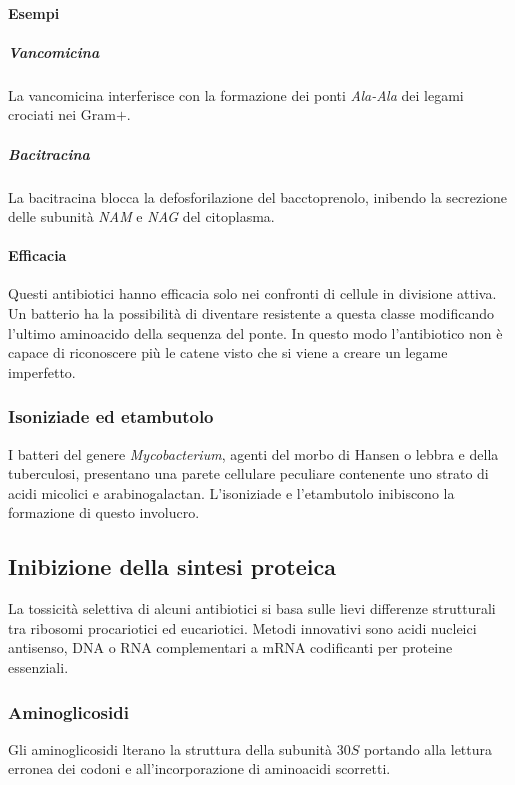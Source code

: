 			\paragraph{Esempi}

				\subparagraph{Vancomicina}
				La vancomicina interferisce con la formazione dei ponti \emph{Ala-Ala} dei legami crociati nei Gram$+$. 

				\subparagraph{Bacitracina}
				La bacitracina blocca la defosforilazione del bacctoprenolo, inibendo la secrezione delle subunità \emph{NAM} e \emph{NAG} del citoplasma. 

			\paragraph{Efficacia}
			Questi antibiotici hanno efficacia solo nei confronti di cellule in divisione attiva.
			Un batterio ha la possibilità di diventare resistente a questa classe modificando l'ultimo aminoacido della sequenza del ponte. 
			In questo modo l'antibiotico non è capace di riconoscere più le catene visto che si viene a creare un legame imperfetto.

		\subsubsection{Isoniziade ed etambutolo}
		I batteri del genere \textit{Mycobacterium}, agenti del morbo di Hansen o lebbra e della tuberculosi, presentano una parete cellulare peculiare contenente uno strato di acidi micolici e arabinogalactan. 
		L'isoniziade e l'etambutolo inibiscono la formazione di questo involucro. 

	\subsection{Inibizione della sintesi proteica}
	La tossicità selettiva di alcuni antibiotici si basa sulle lievi differenze strutturali tra ribosomi procariotici ed eucariotici. 
	Metodi innovativi sono acidi nucleici antisenso, DNA o RNA complementari a mRNA codificanti per proteine essenziali.

		\subsubsection{Aminoglicosidi}
		Gli aminoglicosidi lterano la struttura della subunit\`a $30S$ portando alla lettura erronea dei codoni e all'incorporazione di aminoacidi scorretti.
		
